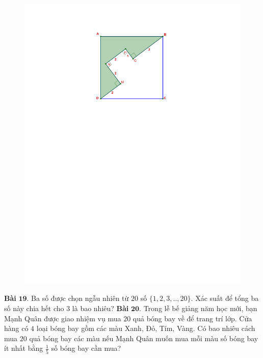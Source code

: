 \begin{multicols}{2}
\begin{figure}[H]
		\vspace*{-5pt}
		\centering
		\captionsetup{labelformat= empty, justification=centering}
		\includegraphics[width= 0.7\linewidth]{bai10}
		\vspace*{-10pt}
	\end{figure}
	\textbf{\color{toancuabi}Bài} $\pmb{19.}$ Ba số được chọn ngẫu nhiên từ $20$ số $\{1,2,3,..,20\}$. Xác suất để tổng ba số này chia hết cho $3$ là bao nhiêu?
	\vskip 0.1cm
	\textbf{\color{toancuabi}Bài} $\pmb{20.}$ Trong lễ bế giảng năm học mới, bạn Mạnh Quân được giao nhiệm vụ mua $20$ quả bóng bay về để trang trí lớp. Cửa hàng có $4$ loại bóng bay gồm các màu Xanh, Đỏ, Tím, Vàng. Có bao nhiêu cách mua $20$ quả bóng bay các màu nếu Mạnh Quân muốn mua mỗi màu số bóng bay ít nhất bằng $\frac{1}{5}$ số bóng bay cần mua?
\end{multicols}
